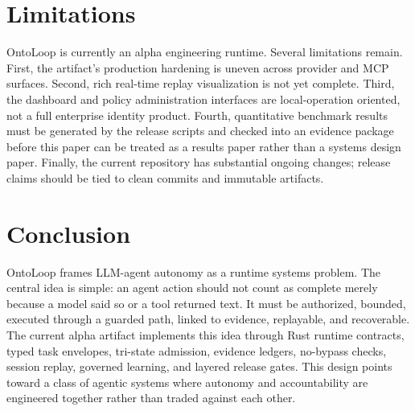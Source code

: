 \documentclass[11pt]{article}
\begin{document}
\section{Limitations}

OntoLoop is currently an alpha engineering runtime. Several limitations remain.
First, the artifact's production hardening is uneven across provider and MCP
surfaces. Second, rich real-time replay visualization is not yet complete. Third,
the dashboard and policy administration interfaces are local-operation oriented,
not a full enterprise identity product. Fourth, quantitative benchmark results
must be generated by the release scripts and checked into an evidence package
before this paper can be treated as a results paper rather than a systems design
paper. Finally, the current repository has substantial ongoing changes; release
claims should be tied to clean commits and immutable artifacts.

\section{Conclusion}

OntoLoop frames LLM-agent autonomy as a runtime systems problem. The central idea is
simple: an agent action should not count as complete merely because a model said so
or a tool returned text. It must be authorized, bounded, executed through a guarded
path, linked to evidence, replayable, and recoverable. The current alpha artifact
implements this idea through Rust runtime contracts, typed task envelopes,
tri-state admission, evidence ledgers, no-bypass checks, session replay, governed
learning, and layered release gates. This design points toward a class of
agentic systems where autonomy and accountability are engineered together rather
than traded against each other.
\end{document}
